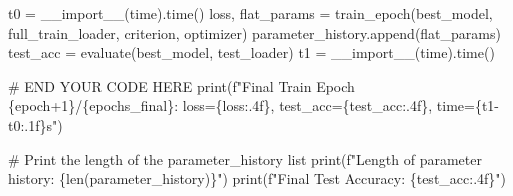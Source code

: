 \documentclass[
  letterpaper,
  DIV=11,
  numbers=noendperiod]{scrartcl}
\newenvironment{Shaded}{\begin{snugshade}}{\end{snugshade}}
\newcommand{\BuiltInTok}[1]{\textcolor[rgb]{0.00,0.23,0.31}{#1}}
\newcommand{\CommentTok}[1]{\textcolor[rgb]{0.37,0.37,0.37}{#1}}
\newcommand{\DecValTok}[1]{\textcolor[rgb]{0.68,0.00,0.00}{#1}}
\newcommand{\NormalTok}[1]{\textcolor[rgb]{0.00,0.23,0.31}{#1}}
\newcommand{\OperatorTok}[1]{\textcolor[rgb]{0.37,0.37,0.37}{#1}}
\newcommand{\RegionMarkerTok}[1]{\textcolor[rgb]{0.00,0.23,0.31}{#1}}
\newcommand{\SpecialCharTok}[1]{\textcolor[rgb]{0.37,0.37,0.37}{#1}}
\newcommand{\SpecialStringTok}[1]{\textcolor[rgb]{0.13,0.47,0.30}{#1}}
\newcommand{\StringTok}[1]{\textcolor[rgb]{0.13,0.47,0.30}{#1}}
\begin{document}
\begin{Shaded}
\begin{Highlighting}[]
\NormalTok{    t0 }\OperatorTok{=} \BuiltInTok{\_\_import\_\_}\NormalTok{(}\StringTok{\textquotesingle{}time\textquotesingle{}}\NormalTok{).time()}
\NormalTok{    loss, flat\_params }\OperatorTok{=}\NormalTok{ train\_epoch(best\_model, full\_train\_loader, criterion, optimizer)}
\NormalTok{    parameter\_history.append(flat\_params) }
\NormalTok{    test\_acc }\OperatorTok{=}\NormalTok{ evaluate(best\_model, test\_loader)}
\NormalTok{    t1 }\OperatorTok{=} \BuiltInTok{\_\_import\_\_}\NormalTok{(}\StringTok{\textquotesingle{}time\textquotesingle{}}\NormalTok{).time()}


    \CommentTok{\# }\RegionMarkerTok{END}\CommentTok{ YOUR CODE HERE}
    \BuiltInTok{print}\NormalTok{(}\SpecialStringTok{f"Final Train Epoch }\SpecialCharTok{\{}\NormalTok{epoch}\OperatorTok{+}\DecValTok{1}\SpecialCharTok{\}}\SpecialStringTok{/}\SpecialCharTok{\{}\NormalTok{epochs\_final}\SpecialCharTok{\}}\SpecialStringTok{: loss=}\SpecialCharTok{\{}\NormalTok{loss}\SpecialCharTok{:.4f\}}\SpecialStringTok{, test\_acc=}\SpecialCharTok{\{}\NormalTok{test\_acc}\SpecialCharTok{:.4f\}}\SpecialStringTok{, time=}\SpecialCharTok{\{}\NormalTok{t1}\OperatorTok{{-}}\NormalTok{t0}\SpecialCharTok{:.1f\}}\SpecialStringTok{s"}\NormalTok{)}

\CommentTok{\# Print the length of the parameter\_history list}
\BuiltInTok{print}\NormalTok{(}\SpecialStringTok{f"Length of parameter history: }\SpecialCharTok{\{}\BuiltInTok{len}\NormalTok{(parameter\_history)}\SpecialCharTok{\}}\SpecialStringTok{"}\NormalTok{)}
\BuiltInTok{print}\NormalTok{(}\SpecialStringTok{f"Final Test Accuracy: }\SpecialCharTok{\{}\NormalTok{test\_acc}\SpecialCharTok{:.4f\}}\SpecialStringTok{"}\NormalTok{)}
\end{Highlighting}
\end{Shaded}
\end{document}
